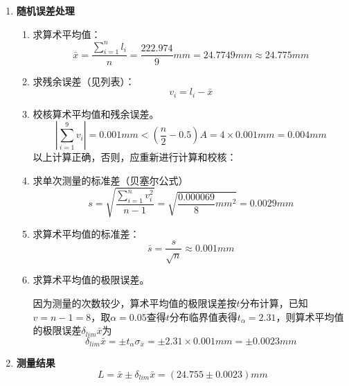 \begin{enumerate}
	\item \textbf{随机误差处理}
		\begin{enumerate}
			\item 求算术平均值：
			\begin{equation}\bar{x}=\frac{\sum\limits_{i=1}^{n}l_i}{n}=\frac{222.974}{9}mm=24.7749mm\approx24.775mm\end{equation}
			\item 求残余误差（见列表）：\begin{equation}v_i=l_i-\bar{x}\end{equation}
			\item 校核算术平均值和残余误差。\begin{equation} \left| \sum\limits_{i=1}^{9}v_i \right|=0.001mm<\left(\frac{n}{2}-0.5\right)A=4\times0.001mm=0.004mm  \end{equation}
			以上计算正确，否则，应重新进行计算和校核：
			\item 求单次测量的标准差（贝塞尔公式）\begin{equation} s=\sqrt{\frac{\sum\limits_{i=1}^{n}v_i^2}{n-1}}=\sqrt{\frac{0.000069}{8}mm^2}=0.0029mm \end{equation}
			\item 求算术平均值的标准差：\begin{equation} \bar{s}=\frac{s}{\sqrt{n}}\approx0.001mm \end{equation}
			\item 求算术平均值的极限误差。
			
			\qquad 因为测量的次数较少，算术平均值的极限误差按$ t $分布计算，已知$ v=n-1=8 $，取$ \alpha=0.05 $查得$ t $分布临界值表得$ t_\alpha=2.31 $，则算术平均值的极限误差$ \delta_{lim}\bar{x} $为\begin{equation} \delta_{lim}\bar{x}=\pm t_\alpha\sigma_{\bar{x}}=\pm2.31\times0.001mm=\pm0.0023mm \end{equation}
		\end{enumerate}
	\item \textbf{测量结果}\begin{equation} L=\bar{x}\pm\delta_{lim}\bar{x}=(24.755\pm0.0023)mm \end{equation}
\end{enumerate}
